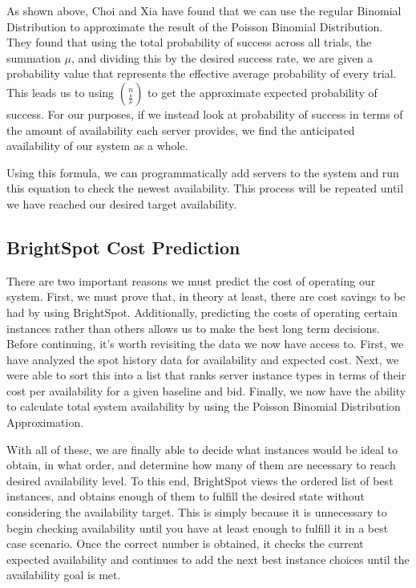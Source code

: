 \documentclass[thesis,proposal]{umassthesis}  %
\begin{document}
As shown above, Choi and Xia have found that we can use the regular Binomial Distribution to approximate the result of the Poisson Binomial Distribution. They found that using the total probability of success across all trials, the summation $\mu$, and dividing this by the desired success rate, we are given a probability value that represents the effective average probability of every trial. This leads us to using $n \choose \frac{k}{\mu}$ to get the approximate expected probability of success. For our purposes, if we instead look at probability of success in terms of the amount of availability each server provides, we find the anticipated availability of our system as a whole.\par

Using this formula, we can programmatically add servers to the system and run this equation to check the newest availability. This process will be repeated until we have reached our desired target availability.



\subsection{BrightSpot Cost Prediction}

There are two important reasons we must predict the cost of operating our system. First, we must prove that, in theory at least, there are cost savings to be had by using BrightSpot. Additionally, predicting the costs of operating certain instances rather than others allows us to make the best long term decisions. Before continuing, it's worth revisiting the data we now have access to. First, we have analyzed the spot history data for availability and expected cost. Next, we were able to sort this into a list that ranks server instance types in terms of their cost per availability for a given baseline and bid. Finally, we now have the ability to calculate total system availability by using the Poisson Binomial Distribution Approximation.\par

With all of these, we are finally able to decide what instances would be ideal to obtain, in what order, and determine how many of them are necessary to reach desired availability level. To this end, BrightSpot views the ordered list of best instances, and obtains enough of them to fulfill the desired state without considering the availability target. This is simply because it is unnecessary to begin checking availability until you have at least enough to fulfill it in a best case scenario. Once the correct number is obtained, it checks the current expected availability and continues to add the next best instance choices until the availability goal is met.\par
\end{document}
